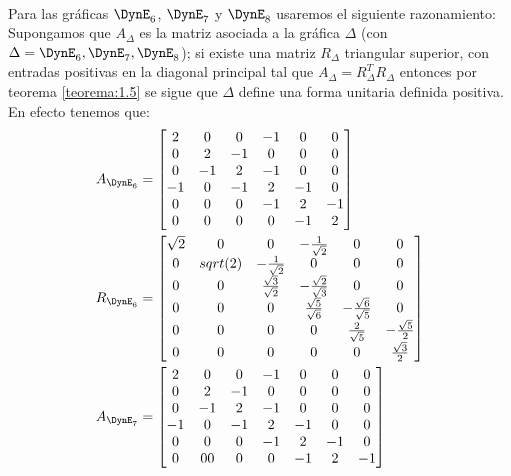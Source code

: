 \paragraph{}
Para las gráficas $\DynE_{6}$, $\DynE_{7}$ y $\DynE_{8}$ usaremos el siguiente razonamiento:\\
Supongamos que $A_{\Delta}$ es la matriz asociada a la gráfica $\Delta$ (con $\Delta = \DynE_{6},\DynE_{7},\DynE_{8}$); si existe una matriz $R_{\Delta}$ triangular superior, con entradas positivas en la diagonal principal tal que $A_{\Delta} = R_{\Delta}^{T}R_{\Delta}$ entonces por teorema \ref{teorema:1.5} se sigue que $\Delta$ define una forma unitaria definida positiva.\\
En efecto tenemos que:
\begin{align*}
 A_{\DynE_{6}} &  =  \begin{bmatrix}
 2 & 0 & 0 & -1 & 0 & 0\\
 0 & 2 & -1 & 0 & 0 & 0\\
 0 & -1 & 2& -1 & 0 & 0\\
 -1 & 0 & -1 & 2 & -1 & 0\\
 0 & 0 & 0 & -1 & 2 & -1\\
 0 & 0 & 0 & 0 & -1 & 2\\
 \end{bmatrix}\\
 R_{\DynE_{6}} &  =   \begin{bmatrix}
 \sqrt{2} & 0 & 0 & -\frac{1}{\sqrt{2}} & 0 & 0\\
 0 & sqrt(2) & - \frac{1}{\sqrt{2}}& 0 & 0 & 0\\
 0 & 0 & \frac{\sqrt{3}}{\sqrt{2}} & -\frac{\sqrt{2}}{\sqrt{3}} & 0 & 0\\
 0 & 0 & 0 & \frac{\sqrt{5}}{\sqrt{6}} & -\frac{\sqrt{6}}{\sqrt{5}} & 0\\
 0 & 0 & 0 & 0 & \frac{2}{\sqrt{5}} & -\frac{\sqrt{5}}{2}\\
 0 & 0 & 0 & 0 & 0 & \frac{\sqrt{3}}{2}\\
 \end{bmatrix}\\
 A_{\DynE_{7}} &  =  \begin{bmatrix}
 2 & 0 & 0 & -1 & 0 & 0 & 0\\
 0 & 2 & -1 & 0 & 0 & 0 & 0\\
 0 & -1 & 2 & -1 & 0 & 0 & 0\\
 -1 & 0 & -1 & 2 & -1 & 0 & 0\\
 0 & 0 & 0 & -1 & 2 & -1 & 0\\
 0 & 0 0 & 0 & 0 & -1 & 2 & -1\\

\end{bmatrix}
\end{align*}
